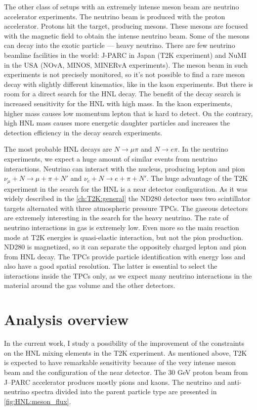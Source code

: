 \documentclass[../main.tex]{subfiles}
\begin{document}
The other class of setups with an extremely intense meson beam are neutrino accelerator experiments. The neutrino beam is produced with the proton accelerator. Protons hit the target, producing mesons. These mesons are focused with the magnetic field to obtain the intense neutrino beam. Some of the mesons can decay into the exotic particle --- heavy neutrino. There are few neutrino beamline facilities in the world: J-PARC in Japan (T2K experiment) and NuMI in the USA (NOvA, MINOS, MINERvA experiments). The meson beam in such experiments is not precisely monitored, so it's not possible to find a rare meson decay with slightly different kinematics, like in the kaon experiments. But there is room for a direct search for the HNL decay. The benefit of the decay search is increased sensitivity for the HNL with high mass. In the kaon experiments, higher mass causes low momentum lepton that is hard to detect. On the contrary, high HNL mass causes more energetic daughter particles and increases the detection efficiency in the decay search experiments.

The most probable HNL decays are $N\to\mu\pi$ and $N\to e\pi$. In the neutrino experiments, we expect a huge amount of similar events from neutrino interactions. Neutrino can interact with the nucleus, producing lepton and pion $\nu_\mu+N\to\mu+\pi+N'$ and $\nu_e+N\to e+\pi+N'$. The huge advantage of the T2K experiment in the search for the HNL is a near detector configuration. As it was widely described in the \autoref{ch:T2K:general} the ND280 detector uses two scintillator targets alternated with three atmospheric pressure TPCs. The gaseous detectors are extremely interesting in the search for the heavy neutrino. The rate of neutrino interactions in gas is extremely low. Even more so the main reaction mode at T2K energies is quasi-elastic interaction, but not the pion production. ND280 is magnetized, so it can separate the oppositely charged lepton and pion from HNL decay. The TPCs provide particle identification with energy loss and also have a good spatial resolution. The latter is essential to select the interactions inside the TPCs only, as we expect many neutrino interactions in the material around the gas volume and the other detectors.

\section{Analysis overview}
In the current work, I study a possibility of the improvement of the constraints on the HNL mixing elements in the T2K experiment. As mentioned above, T2K is expected to have remarkable sensitivity because of the very intense meson beam and the configuration of the near detector. The 30 GeV proton beam from J--PARC accelerator produces mostly pions and kaons. The neutrino and anti-neutrino spectra divided into the parent particle type are presented in \autoref{fig:HNL:meson_flux}.
\end{document}
